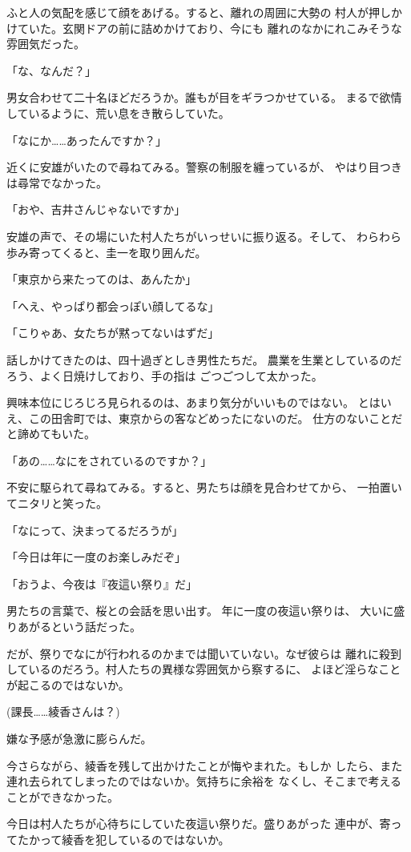 ﻿\documentclass[
    book,tate,
    line_length=30zw,
    jafontsize=12pt,
    paper=b5j,
    landscape,
    ]{jlreq}
\begin{document}
ふと人の気配を感じて顔をあげる。すると、離れの周囲に大勢の
村人が押しかけていた。玄関ドアの前に詰めかけており、今にも
離れのなかにれこみそうな雰囲気だった。

「な、なんだ？」

男女合わせて二十名ほどだろうか。誰もが目をギラつかせている。
まるで欲情しているように、荒い息をき散らしていた。

「なにか……あったんですか？」

近くに安雄がいたので尋ねてみる。警察の制服を纏っているが、
やはり目つきは尋常でなかった。

「おや、吉井さんじゃないですか」

安雄の声で、その場にいた村人たちがいっせいに振り返る。そして、
わらわら歩み寄ってくると、圭一を取り囲んだ。

「東京から来たってのは、あんたか」

「へえ、やっぱり都会っぽい顔してるな」

「こりゃあ、女たちが黙ってないはずだ」

話しかけてきたのは、四十過ぎとしき男性たちだ。
農業を生業としているのだろう、よく日焼けしており、手の指は
ごつごつして太かった。

興味本位にじろじろ見られるのは、あまり気分がいいものではない。
とはいえ、この田舎町では、東京からの客などめったにないのだ。
仕方のないことだと諦めてもいた。

「あの……なにをされているのですか？」

不安に駆られて尋ねてみる。すると、男たちは顔を見合わせてから、
一拍置いてニタリと笑った。

「なにって、決まってるだろうが」

「今日は年に一度のお楽しみだぞ」

「おうよ、今夜は『夜這い祭り』だ」

男たちの言葉で、桜との会話を思い出す。 年に一度の夜這い祭りは、
大いに盛りあがるという話だった。

だが、祭りでなにが行われるのかまでは聞いていない。なぜ彼らは
離れに殺到しているのだろう。村人たちの異様な雰囲気から察するに、
よほど淫らなことが起こるのではないか。

(課長……綾香さんは？)

嫌な予感が急激に膨らんだ。

今さらながら、綾香を残して出かけたことが悔やまれた。もしか
したら、また連れ去られてしまったのではないか。気持ちに余裕を
なくし、そこまで考えることができなかった。

今日は村人たちが心待ちにしていた夜這い祭りだ。盛りあがった
連中が、寄ってたかって綾香を犯しているのではないか。
\end{document}
